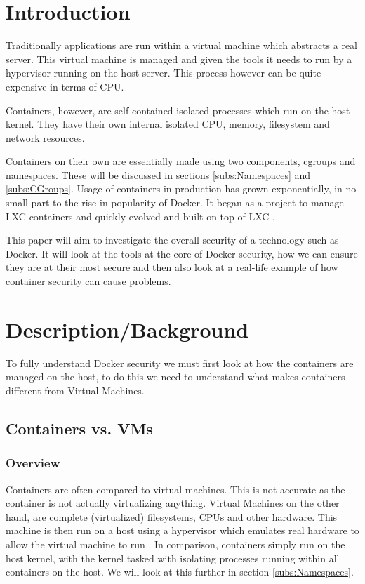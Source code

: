 \documentclass{article}
\author{Stephen Coady}
\begin{document}

\thispagestyle{empty}

\newpage
\tableofcontents
\newpage

\newpage
\section{Introduction}
\label{sec:Introduction} %
Traditionally applications are run within a virtual machine which abstracts a real server. This virtual machine is managed and given the tools it needs to run by a hypervisor running on the host server. This process however can be quite expensive in terms of CPU.

Containers, however, are self-contained isolated processes which run on the host kernel. They have their own internal isolated CPU, memory, filesystem and network resources. 

Containers on their own are essentially made using two components, cgroups and namespaces. These will be discussed in sections \ref{subs:Namespaces} and \ref{subs:CGroups}. Usage of containers in production has grown exponentially, in no small part to the rise in popularity of Docker. It began as a project to manage LXC containers and quickly evolved and built on top of LXC \citep{BCN}.

This paper will aim to investigate the overall security of a technology such as Docker. It will look at the tools at the core of Docker security, how we can ensure they are at their most secure and then also look at a real-life example of how container security can cause problems.

\newpage
\section{Description/Background}
\label{sec:Description/Background}
To fully understand Docker security we must first look at how the containers are managed on the host, to do this we need to understand what makes containers different from Virtual Machines.

\subsection{Containers vs. VMs}
\label{subs:VMs}
\subsubsection{Overview}
Containers are often compared to virtual machines. This is not accurate as the container is not actually virtualizing anything. Virtual Machines on the other hand, are complete (virtualized) filesystems, CPUs and other hardware. This machine is then run on a host using a hypervisor which emulates real hardware to allow the virtual machine to run \citep{Hertz2016}. In comparison, containers simply run on the host kernel, with the kernel tasked with isolating processes running within all containers on the host. We will look at this further in section \ref{subs:Namespaces}.
\end{document}
